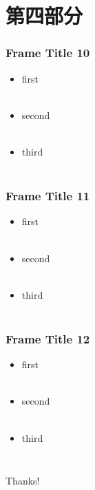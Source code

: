 \documentclass[10pt,aspectratio=43]{beamer} %
\begin{document}
	\section{第四部分}
	\begin{frame}
		\frametitle{Frame Title 10}
		\begin{itemize} 
			\item first \\~\\
			\item second \\~\\
			\item third \\~\\
		\end{itemize}
	\end{frame}
	\begin{frame}
		\frametitle{Frame Title 11}
		\begin{itemize} 
			\item first \\~\\
			\item second \\~\\
			\item third \\~\\
		\end{itemize}
	\end{frame}
	\begin{frame}
		\frametitle{Frame Title 12}
		\begin{itemize}
			\item first \\~\\
			\item second \\~\\
			\item third \\~\\
		\end{itemize}
	\end{frame}
	\begin{frame}
		\frametitle{{}} %
		\begin{center} %
		{\Huge Thanks!} %
	    \end{center}
	\end{frame}
\end{document}
